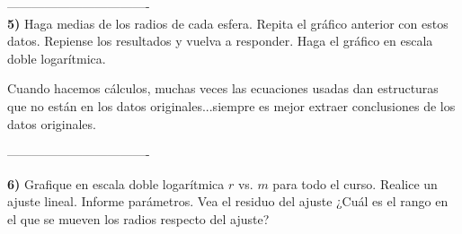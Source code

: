 \documentclass[10pt,a4paper]{article}
\numberwithin{equation}{section}
\begin{document}
\-----------------------------------\\

\noindent \textbf{5)} Haga medias de los radios de cada esfera. Repita el gráfico anterior con estos datos. Repiense los resultados y vuelva a responder. Haga el gráfico en escala doble logarítmica.

Cuando hacemos cálculos, muchas veces las ecuaciones usadas dan estructuras que no están en los datos originales...siempre es mejor extraer conclusiones de los datos originales.

\-----------------------------------

\noindent \textbf{6)} Grafique en escala doble logarítmica $r$ vs. $m$ para todo el curso. Realice un ajuste lineal. Informe parámetros. Vea el residuo del ajuste ¿Cuál es el rango en el que se mueven los radios respecto del ajuste?
\end{document}
